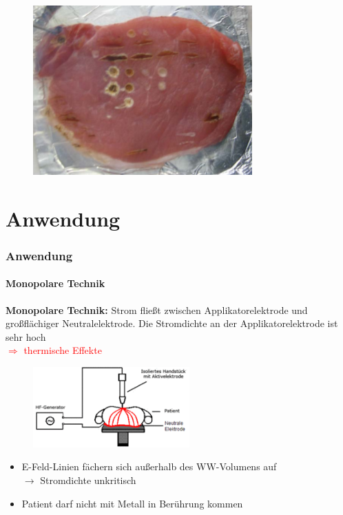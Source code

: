 \documentclass{beamer}
\begin{document}
\begin{frame}
	\begin{figure}
		\centering
		\includegraphics[]{images/fleisch.png}
	\end{figure}
\end{frame}


\section{Anwendung}
\begin{frame}
\frametitle{Anwendung}
\framesubtitle{Monopolare Technik}
	\textbf{Monopolare Technik:}
	Strom fließt zwischen Applikatorelektrode und großflächiger Neutralelektrode. Die Stromdichte an der Applikatorelektrode ist sehr hoch
	\\\textcolor{red}{$\Rightarrow$ thermische Effekte}
	\begin{figure}
		\centering
		\includegraphics[width=6cm]{images/_monopolareTechnik.png}
		\cite{wiki:HF}
	\end{figure}
	\begin{itemize}
		\item E-Feld-Linien fächern sich außerhalb des WW-Volumens auf \\$\rightarrow$ Stromdichte unkritisch
		\item Patient darf nicht mit Metall in Berührung kommen
	\end{itemize}

\end{frame}
\end{document}

